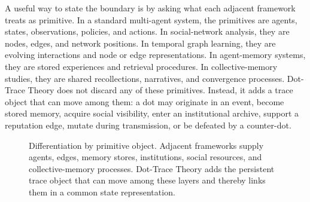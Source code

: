 \documentclass[11pt]{article}
\theoremstyle{remark}
\begin{document}
A useful way to state the boundary is by asking what each adjacent framework treats as primitive. In a standard multi-agent system, the primitives are agents, states, observations, policies, and actions. In social-network analysis, they are nodes, edges, and network positions. In temporal graph learning, they are evolving interactions and node or edge representations. In agent-memory systems, they are stored experiences and retrieval procedures. In collective-memory studies, they are shared recollections, narratives, and convergence processes. Dot-Trace Theory does not discard any of these primitives. Instead, it adds a trace object that can move among them: a dot may originate in an event, become stored memory, acquire social visibility, enter an institutional archive, support a reputation edge, mutate during transmission, or be defeated by a counter-dot.

\begin{figure}[htbp]
\centering
{}
\caption{Differentiation by primitive object. Adjacent frameworks supply agents, edges, memory stores, institutions, social resources, and collective-memory processes. Dot-Trace Theory adds the persistent trace object that can move among these layers and thereby links them in a common state representation.}
\label{fig:differentiation-by-primitive}
\end{figure}
\end{document}
